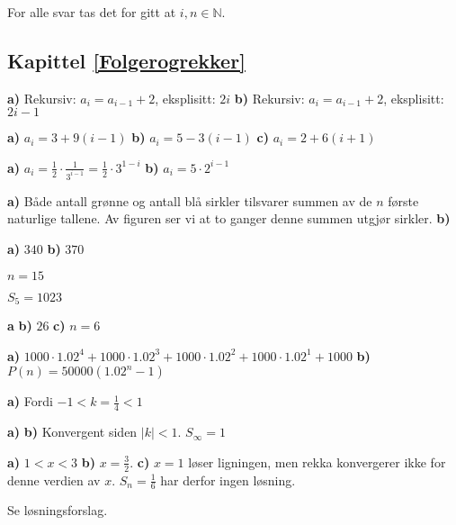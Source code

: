 




\footnotesize

For alle svar tas det for gitt at $ i,n\in\mathbb{N} $.

\subsection*{Kapittel \ref{Folgerogrekker}}
\textbf{a)} Rekursiv: $ {a_i=a_{i-1}+2 }$, eksplisitt: $ 2i $
\textbf{b)} Rekursiv: $ {a_i=a_{i-1}+2 }$, eksplisitt: $ {2i-1} $

\textbf{a)} $ a_i = 3+9(i-1) $
\textbf{b)} $ a_i=5-3(i-1) $
\textbf{c)} $ a_i = 2+6(i+1) $

\textbf{a)} $ a_i = \frac{1}{2}\cdot\frac{1}{3^{i-1}}=\frac{1}{2}\cdot3^{1-i} $
\textbf{b)} $ a_i = 5\cdot2^{i-1}  $

 \textbf{a)} Både antall grønne og antall blå sirkler tilsvarer summen av de $ n $ første naturlige tallene. Av figuren ser vi at to ganger denne summen utgjør  sirkler. \textbf{b)} \sel

\textbf{a)} $ 340 $
\textbf{b)} $ 370 $

$ n=15 $

 \sel

$ S_5=1023 $


\textbf{a} \sel
\textbf{b)} $ 26 $
\textbf{c)} $ n=6 $

\textbf{a)} $ 1000\cdot1.02^4+1000\cdot1.02^3+1000\cdot1.02^2+1000\cdot1.02^1+1000 $
\textbf{b)} $ P(n)= 50000(1.02^n-1) $

\textbf{a)} Fordi $ -1<k=\frac{1}{4}<1 $

\begin{comment}
	\opr{stav}
Lengden blir $ \frac{10}{9} $ m.
\end{comment}
 \textbf{a)}  \textbf{b)} Konvergent siden $ |k|<1 $. $ S_\infty=1 $

\textbf{a)} $ 1<x<3 $
\textbf{b)} $ x=\frac{3}{2} $.
\textbf{c)} $ x=1 $ løser ligningen, men rekka konvergerer ikke for denne verdien av $ x $. $ S_n=\frac{1}{6} $ har derfor ingen løsning.

 Se løsningsforslag.

 \sel
